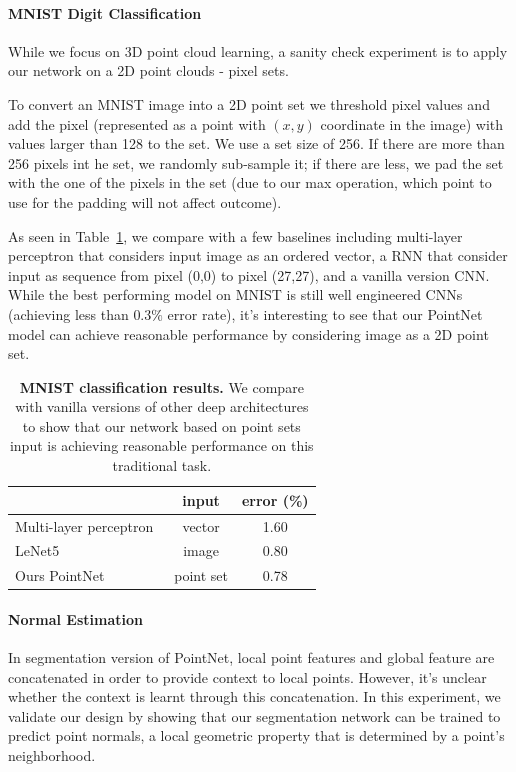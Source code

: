 \paragraph{MNIST Digit Classification}
While we focus on 3D point cloud learning, a sanity check experiment is to apply our network on a 2D point clouds - pixel sets.

To convert an MNIST image into a 2D point set we threshold pixel values and add the pixel (represented as a point with $(x,y)$ coordinate in the image) with values larger than 128 to the set. We use a set size of 256. If there are more than 256 pixels int he set, we randomly sub-sample it; if there are less, we pad the set with the one of the pixels in the set (due to our max operation, which point to use for the padding will not affect outcome).


As seen in Table~\ref{tab:mnist}, we compare with a few baselines including multi-layer perceptron that considers input image as an ordered vector, a RNN that consider input as sequence from pixel (0,0) to pixel (27,27), and a vanilla version CNN. While the best performing model on MNIST is still well engineered CNNs (achieving less than $0.3\%$ error rate), it's interesting to see that our PointNet model can achieve reasonable performance by considering image as a 2D point set.

\begin{table}[h!]
    \centering
    \begin{tabular}[width=\linewidth]{l|c|c}
    \hline
    ~                      & input & error (\%) \\ \hline
    Multi-layer perceptron~\cite{simard2003best} & vector & 1.60  \\
    LeNet5~\cite{lecun1998gradient}                 & image & 0.80 \\ \hline
    Ours PointNet          & point set & 0.78 \\ \hline
    \end{tabular}
    \caption{\textbf{MNIST classification results.} We compare with vanilla versions of other deep architectures to show that our network based on point sets input is achieving reasonable performance on this traditional task.}
    \label{tab:mnist}
\end{table}

\paragraph{Normal Estimation}
In segmentation version of PointNet, local point features and global feature are concatenated in order to provide context to local points. However, it's unclear whether the context is learnt through this concatenation. In this experiment, we validate our design by showing that our segmentation network can be trained to predict point normals, a local geometric property that is determined by a point's neighborhood.

